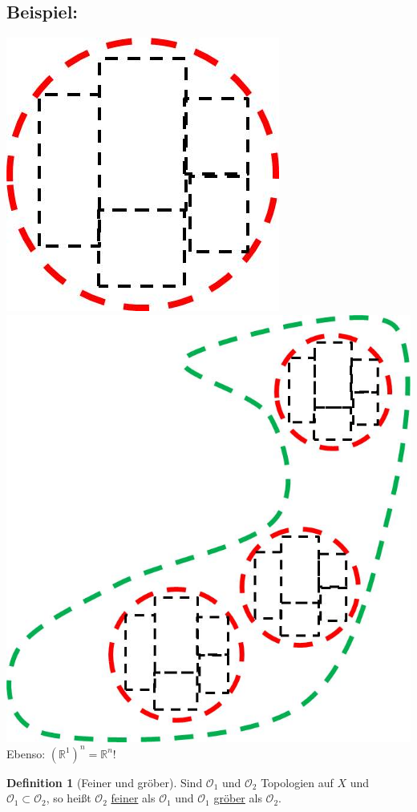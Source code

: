 \documentclass[a4paper,11pt,notitlepage]{report}
\theoremstyle{remark}
\theoremstyle{definition}
\newtheorem{definition}{Definition}[chapter]
\newcommand{\R}{{\ensuremath{\mathbb{R}}}}
\newcommand{\OO}{{\ensuremath{\mathcal{O}}}}
\newenvironment{bsp}[1]
{
\setlength{\fboxsep}{10pt}
\subsection*{Beispiel: #1}
\begin{upshape}
}
{
\end{upshape}
}
\begin{document}
\begin{bsp}{}
\includegraphics[scale=0.4]{images/Kreis_Rechteck.jpg} 
\includegraphics[scale=0.4]{images/Kreis_Rechteck_Basis.jpg} 
	Ebenso: $(\R^1)^n = \R^n$!
\end{bsp}

\begin{definition}[Feiner und gröber]
	Sind $\OO_1$ und $\OO_2$ Topologien auf $X$ und $\OO_1 \subset \OO_2$, 
	\newline so heißt $\OO_2$ \underline{feiner} als $\OO_1$ und $\OO_1$ \underline{gröber} als $\OO_2$.
\end{definition}
\end{document}
